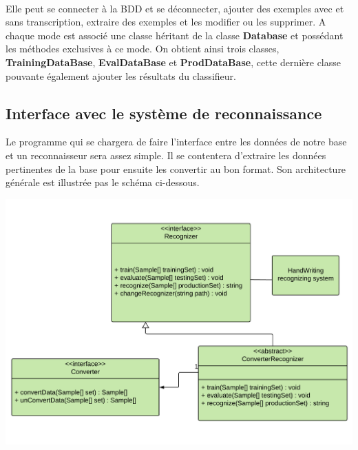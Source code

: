 \paragraph{}

Elle peut se connecter à la BDD et se déconnecter, ajouter des exemples avec
et sans transcription, extraire des exemples et les modifier ou les supprimer.
A chaque mode est associé une classe héritant de la classe \textbf{Database}
et possédant les méthodes exclusives à ce mode. On obtient ainsi trois
classes, \textbf{TrainingDataBase}, \textbf{EvalDataBase} et
\textbf{ProdDataBase}, cette dernière classe pouvante également ajouter les
résultats du classifieur.

\subsection{Interface avec le système de reconnaissance}

Le programme qui se chargera de faire l’interface entre les données de notre
base et un reconnaisseur sera assez simple. Il se contentera d’extraire les
données pertinentes de la base pour ensuite les convertir au bon format.
Son architecture générale est illustrée pas le schéma ci-dessous.

\newpage

\begin{mdframed}[frametitle={Figure 9 : Diagramme de classes de l'interface avec le système de reconaissance d'écriture manuscrite}, innerbottommargin=10]
\begin{center}
\includegraphics[scale=0.5]{interface-reconnaisseur.pdf}
\end{center}
\end{mdframed}

